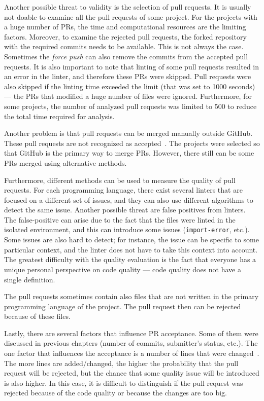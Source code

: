 \documentclass[digital,oneside,oldtable,nolof,nolot,nocover]{fithesis4}
\begin{document}
Another possible threat to validity is the selection of pull requests.
It is usually not doable to examine all the pull requests of some project.
For the projects with a huge number of PRs, the time and computational resources are
the limiting factors. Moreover, to examine the rejected pull requests, the forked
repository with the required commits needs to be available. This is not always the case.
Sometimes the \emph{force push} can also remove the commits from the accepted pull requests.
It is also important to note that linting of some pull requests resulted in an error in the
linter, and therefore these PRs were skipped. Pull requests were also skipped if the
linting time exceeded the limit (that was set to 1000 seconds) --- the PRs that
modified a huge number of files were ignored. Furthermore, for some projects,
the number of analyzed pull requests was limited to 500 to reduce the total
time required for analysis.

Another problem is that pull requests can be merged manually outside GitHub.
These pull requests are not recognized as accepted~\cite{ghperils}. The projects were selected so that
GitHub is the primary way to merge PRs. However, there still can be some PRs
merged using alternative methods.

Furthermore, different methods can be used to measure the quality of pull
requests. For each programming language, there exist several linters that
are focused on a different set of issues, and they can also use different algorithms
to detect the same issue. Another possible threat are false positives from linters.
The false-positive can arise due to the fact that the files were linted in the
isolated environment, and this can introduce some issues (\texttt{import-error}, etc.).
Some issues are also hard to detect; for instance, the issue can be specific to
some particular context, and the linter does not have to take this context into
account. The greatest difficulty with the quality evaluation is the fact that
everyone has a unique personal perspective on code quality --- code quality
does not have a single definition.

The pull requests sometimes contain also files that are not written in the
primary programming language of the project. The pull request then can be
rejected because of these files.

Lastly, there are several factors that influence PR acceptance.
Some of them were discussed in previous chapters (number of commits, submitter's status, etc.).
The one factor that influences the acceptance is a number of lines that were changed~\cite{social}.
The more lines are added/changed, the higher the probability that the pull request will be
rejected, but the chance that some quality issue will be introduced is also higher.
In this case, it is difficult to distinguish if the pull request was rejected because
of the code quality or because the changes are too big.
\end{document}
